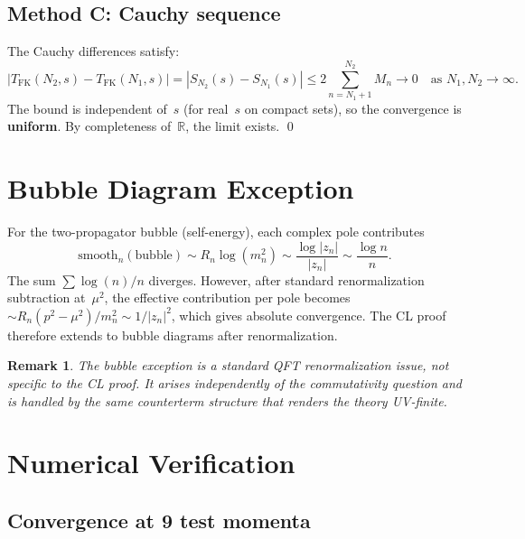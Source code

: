 \documentclass[11pt,a4paper]{article}
\newtheorem{remark}[theorem]{Remark}
\begin{document}
\subsection{Method C: Cauchy sequence}

The Cauchy differences satisfy:
\begin{equation}
  |T_{\mathrm{FK}}(N_2,s) - T_{\mathrm{FK}}(N_1,s)|
  = |S_{N_2}(s) - S_{N_1}(s)|
  \leq 2\sum_{n=N_1+1}^{N_2} M_n
  \to 0 \quad\text{as } N_1,N_2 \to \infty.
\end{equation}
The bound is independent of~$s$ (for real~$s$ on compact sets), so the
convergence is \textbf{uniform}.  By completeness of~$\mathbb{R}$, the
limit exists.  \qed


\section{Bubble Diagram Exception}
\label{sec:bubble}

For the two-propagator bubble (self-energy), each complex pole contributes
\begin{equation}
  \text{smooth}_n(\text{bubble})
  \sim R_n \log(m_n^2)
  \sim \frac{\log|z_n|}{|z_n|}
  \sim \frac{\log n}{n}.
\end{equation}
The sum $\sum \log(n)/n$ diverges.  However, after standard
renormalization subtraction at~$\mu^2$, the effective contribution per
pole becomes $\sim R_n(p^2 - \mu^2)/m_n^2 \sim 1/|z_n|^2$, which gives
absolute convergence.  The CL proof therefore extends to bubble diagrams
after renormalization.

\begin{remark}
The bubble exception is a standard QFT renormalization issue, not specific
to the CL proof.  It arises independently of the commutativity question
and is handled by the same counterterm structure that renders the theory
UV-finite.
\end{remark}


\section{Numerical Verification}
\label{sec:numerics}

\subsection{Convergence at 9 test momenta}
\end{document}
